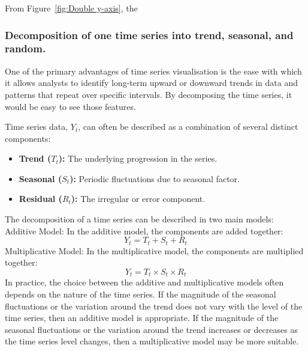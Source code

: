 \documentclass{article}\usepackage[]{graphicx}\usepackage[]{xcolor}
\begin{document}
From Figure~\ref{fig:Double y-axis}, the 


\subsubsection{Decomposition of one time series into trend, seasonal, and random.}

One of the primary advantages of time series visualisation is the ease with which it allows analysts to identify long-term upward or downward trends in data and patterns that repeat over specific intervals. By decomposing the time series, it would be easy to see those features.

Time series data, $Y_t$, can often be described as a combination of several distinct components:
\begin{itemize}
    \item \textbf{Trend ($T_t$):} The underlying progression in the series.
    \item \textbf{Seasonal ($S_t$):} Periodic fluctuations due to seasonal factor.
    \item \textbf{Residual ($R_t$):} The irregular or error component.
\end{itemize}

The decomposition of a time series can be described in two main models:\\
Additive Model:
In the additive model, the components are added together:
\[
Y_t = T_t + S_t + R_t
\]
Multiplicative Model:
In the multiplicative model, the components are multiplied together:
\[
Y_t = T_t \times S_t \times R_t
\]
In practice, the choice between the additive and multiplicative models often depends on the nature of the time series. If the magnitude of the seasonal fluctuations or the variation around the trend does not vary with the level of the time series, then an additive model is appropriate. If the magnitude of the seasonal fluctuations or the variation around the trend increases or decreases as the time series level changes, then a multiplicative model may be more suitable.
\end{document}
